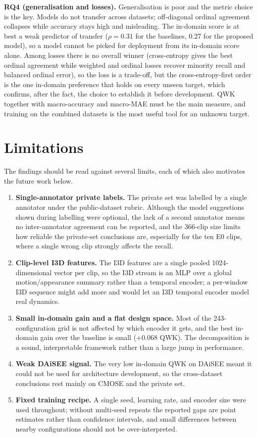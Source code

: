 \documentclass[../main.tex]{subfiles}
\begin{document}
\textbf{RQ4 (generalisation and losses).}
Generalisation is poor and the metric choice is the key. Models do not transfer across datasets; off-diagonal ordinal agreement collapses while accuracy stays high and misleading. The in-domain score is at best a weak predictor of transfer ($\rho=0.31$ for the baselines, 0.27 for the proposed model), so a model cannot be picked for deployment from its in-domain score alone. Among losses there is no overall winner (cross-entropy gives the best ordinal agreement while weighted and ordinal losses recover minority recall and balanced ordinal error), so the loss is a trade-off, but the cross-entropy-first order is the one in-domain preference that holds on every unseen target, which confirms, after the fact, the choice to establish it before development. QWK together with macro-accuracy and macro-MAE must be the main measure, and training on the combined datasets is the most useful tool for an unknown target.

\FloatBarrier
\section{Limitations}
\label{sec:limitations}

The findings should be read against several limits, each of which also motivates the future work below.
\begin{enumerate}
  \item \textbf{Single-annotator private labels.}
  The private set was labelled by a single annotator under the public-dataset rubric. Although the model suggestions shown during labelling were optional, the lack of a second annotator means no inter-annotator agreement can be reported, and the 366-clip size limits how reliable the private-set conclusions are, especially for the ten E0 clips, where a single wrong clip strongly affects the recall.
  \item \textbf{Clip-level I3D features.}
  The I3D features are a single pooled 1024-dimensional vector per clip, so the I3D stream is an MLP over a global motion/appearance summary rather than a temporal encoder; a per-window I3D sequence might add more and would let an I3D temporal encoder model real dynamics.
  \item \textbf{Small in-domain gain and a flat design space.}
  Most of the 243-configuration grid is not affected by which encoder it gets, and the best in-domain gain over the baseline is small ($+0.068$ QWK). The decomposition is a sound, interpretable framework rather than a large jump in performance.
  \item \textbf{Weak DAiSEE signal.}
  The very low in-domain QWK on DAiSEE meant it could not be used for architecture development, so the cross-dataset conclusions rest mainly on CMOSE and the private set.
  \item \textbf{Fixed training recipe.}
  A single seed, learning rate, and encoder size were used throughout; without multi-seed repeats the reported gaps are point estimates rather than confidence intervals, and small differences between nearby configurations should not be over-interpreted.
\end{enumerate}
\end{document}
